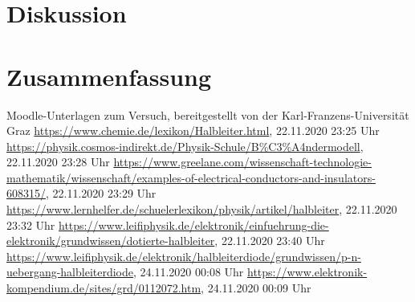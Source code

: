 \documentclass{article}
\begin{document}
\section{Diskussion}





\section{Zusammenfassung}




\begin{thebibliography}{9}
 Moodle-Unterlagen zum Versuch, bereitgestellt von der Karl-Franzens-Universität Graz
 \url{https://www.chemie.de/lexikon/Halbleiter.html}, 22.11.2020 23:25 Uhr
 \url{https://physik.cosmos-indirekt.de/Physik-Schule/B%C3%A4ndermodell}, 22.11.2020 23:28 Uhr
 \url{https://www.greelane.com/wissenschaft-technologie-mathematik/wissenschaft/examples-of-electrical-conductors-and-insulators-608315/}, 22.11.2020 23:29 Uhr
 \url{https://www.lernhelfer.de/schuelerlexikon/physik/artikel/halbleiter}, 22.11.2020 23:32 Uhr
 \url{https://www.leifiphysik.de/elektronik/einfuehrung-die-elektronik/grundwissen/dotierte-halbleiter}, 22.11.2020 23:40 Uhr
 \url{https://www.leifiphysik.de/elektronik/halbleiterdiode/grundwissen/p-n-uebergang-halbleiterdiode}, 24.11.2020 00:08 Uhr
 \url{https://www.elektronik-kompendium.de/sites/grd/0112072.htm}, 24.11.2020 00:09 Uhr
\end{thebibliography}






\lstset{
extendedchars=\true,
inputencoding=utf8
}

%

%


%
\end{document}
